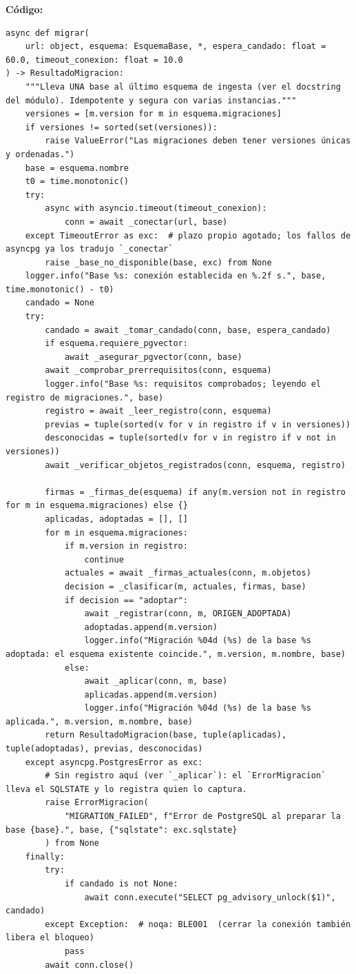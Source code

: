 \documentclass[11pt,a4paper]{article}
\begin{document}
\textbf{Código:}
\begin{lstlisting}
async def migrar(
    url: object, esquema: EsquemaBase, *, espera_candado: float = 60.0, timeout_conexion: float = 10.0
) -> ResultadoMigracion:
    """Lleva UNA base al último esquema de ingesta (ver el docstring del módulo). Idempotente y segura con varias instancias."""
    versiones = [m.version for m in esquema.migraciones]
    if versiones != sorted(set(versiones)):
        raise ValueError("Las migraciones deben tener versiones únicas y ordenadas.")
    base = esquema.nombre
    t0 = time.monotonic()
    try:
        async with asyncio.timeout(timeout_conexion):
            conn = await _conectar(url, base)
    except TimeoutError as exc:  # plazo propio agotado; los fallos de asyncpg ya los tradujo `_conectar`
        raise _base_no_disponible(base, exc) from None
    logger.info("Base %s: conexión establecida en %.2f s.", base, time.monotonic() - t0)
    candado = None
    try:
        candado = await _tomar_candado(conn, base, espera_candado)
        if esquema.requiere_pgvector:
            await _asegurar_pgvector(conn, base)
        await _comprobar_prerrequisitos(conn, esquema)
        logger.info("Base %s: requisitos comprobados; leyendo el registro de migraciones.", base)
        registro = await _leer_registro(conn, esquema)
        previas = tuple(sorted(v for v in registro if v in versiones))
        desconocidas = tuple(sorted(v for v in registro if v not in versiones))
        await _verificar_objetos_registrados(conn, esquema, registro)

        firmas = _firmas_de(esquema) if any(m.version not in registro for m in esquema.migraciones) else {}
        aplicadas, adoptadas = [], []
        for m in esquema.migraciones:
            if m.version in registro:
                continue
            actuales = await _firmas_actuales(conn, m.objetos)
            decision = _clasificar(m, actuales, firmas, base)
            if decision == "adoptar":
                await _registrar(conn, m, ORIGEN_ADOPTADA)
                adoptadas.append(m.version)
                logger.info("Migración %04d (%s) de la base %s adoptada: el esquema existente coincide.", m.version, m.nombre, base)
            else:
                await _aplicar(conn, m, base)
                aplicadas.append(m.version)
                logger.info("Migración %04d (%s) de la base %s aplicada.", m.version, m.nombre, base)
        return ResultadoMigracion(base, tuple(aplicadas), tuple(adoptadas), previas, desconocidas)
    except asyncpg.PostgresError as exc:
        # Sin registro aquí (ver `_aplicar`): el `ErrorMigracion` lleva el SQLSTATE y lo registra quien lo captura.
        raise ErrorMigracion(
            "MIGRATION_FAILED", f"Error de PostgreSQL al preparar la base {base}.", base, {"sqlstate": exc.sqlstate}
        ) from None
    finally:
        try:
            if candado is not None:
                await conn.execute("SELECT pg_advisory_unlock($1)", candado)
        except Exception:  # noqa: BLE001  (cerrar la conexión también libera el bloqueo)
            pass
        await conn.close()
\end{lstlisting}
\end{document}
